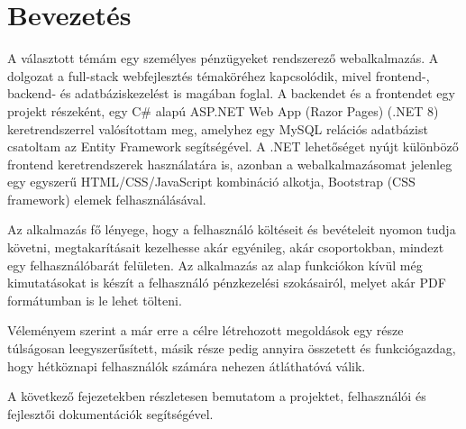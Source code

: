 \chapter{Bevezetés}
\label{ch:intro}

A választott témám egy személyes pénzügyeket rendszerező webalkalmazás. A dolgozat a full-stack webfejlesztés témaköréhez kapcsolódik, mivel frontend-, backend- és adatbáziskezelést is magában foglal. A backendet és a frontendet egy projekt részeként, egy C\# alapú ASP.NET Web App (Razor Pages) (.NET 8) keretrendszerrel valósítottam meg, amelyhez egy MySQL relációs adatbázist csatoltam az Entity Framework segítségével. A .NET lehetőséget nyújt különböző frontend keretrendszerek használatára is, azonban a webalkalmazásomat jelenleg egy egyszerű HTML/CSS/JavaScript kombináció alkotja, Bootstrap (CSS framework) elemek felhasználásával.

Az alkalmazás fő lényege, hogy a felhasználó költéseit és bevételeit nyomon tudja követni, megtakarításait kezelhesse akár egyénileg, akár csoportokban, mindezt egy felhasználóbarát felületen. Az alkalmazás az alap funkciókon kívül még kimutatásokat is készít a felhasználó pénzkezelési szokásairól, melyet akár PDF formátumban is le lehet tölteni.


Véleményem szerint a már erre a célre létrehozott megoldások egy része túlságosan leegyszerűsített, másik része pedig annyira összetett és funkciógazdag, hogy hétköznapi felhasználók számára nehezen átláthatóvá válik.


A következő fejezetekben részletesen bemutatom a projektet, felhasználói és fejlesztői dokumentációk segítségével.
